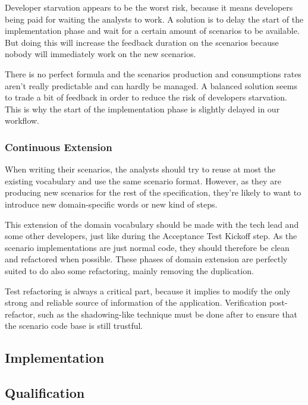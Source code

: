Developer starvation appears to be the worst risk, because it means
developers being paid for waiting the analysts to work.
A solution is to delay the start of the implementation phase and wait for a
certain amount of scenarios to be available.
But doing this will increase the feedback duration on the scenarios because
nobody will immediately work on the new scenarios.

There is no perfect formula and the scenarios production and consumptions
rates aren't really predictable and can hardly be managed.
A balanced solution seems to trade a bit of feedback in order to reduce the
risk of developers starvation.
This is why the start of the implementation phase is slightly delayed in our
workflow.

\subsubsection{Continuous Extension}
When writing their scenarios, the analysts should try to reuse at most the
existing vocabulary and use the same scenario format.
However, as they are producing new scenarios for the rest of the
specification, they're likely to want to introduce new domain-specific words or
new kind of steps.

This extension of the domain vocabulary should be made with the tech lead and
some other developers, just like during the Acceptance Test Kickoff step.
As the scenario implementations are just normal code, they should therefore be
clean and refactored when possible.
These phases of domain extension are perfectly suited to do also some
refactoring, mainly removing the duplication.

Test refactoring is always a critical part, because it implies to modify the
only strong and reliable source of information of the application.
Verification post-refactor, such as the shadowing-like technique must be done
after to ensure that the scenario code base is still trustful.

\subsection{Implementation}\label{subsec:implementation}

\subsection{Qualification}\label{subsec:qualification}

